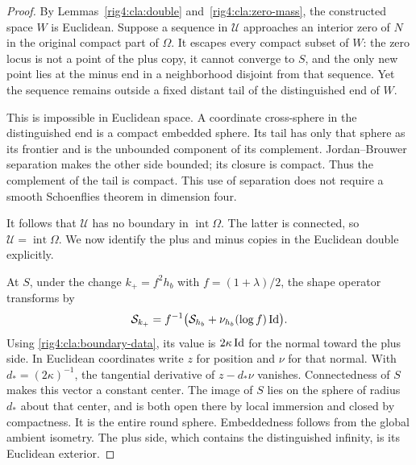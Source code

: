 \begin{proof}
By Lemmas~\ref{rig4:cla:double} and~\ref{rig4:cla:zero-mass}, the constructed
space $W$ is Euclidean.  Suppose a sequence in $\mathcal U$ approaches
an interior zero of $N$ in the original compact part of $\Omega$.
It escapes every compact subset of $W$: the zero locus is not a
point of the plus copy, it cannot converge to $S$, and the only
new point lies at the minus end in a neighborhood disjoint from
that sequence.  Yet the sequence remains outside a fixed distant
tail of the distinguished end of $W$.

This is impossible in Euclidean space.  A coordinate cross-sphere
in the distinguished end is a compact embedded sphere.  Its tail
has only that sphere as its frontier and is the unbounded component
of its complement.  Jordan--Brouwer separation makes the other
side bounded; its closure is compact.  Thus the complement of the
tail is compact.  This use of separation does not require a smooth
Schoenflies theorem in dimension four.

It follows that $\mathcal U$ has no boundary in
$\operatorname{int}\Omega$.  The latter is connected, so
$\mathcal U=\operatorname{int}\Omega$.  We now identify the plus
and minus copies in the Euclidean double explicitly.

At $S$, under the change $k_+=f^2h_b$ with
$f=(1+\lambda)/2$, the shape operator transforms by
\[
 \mathcal S_{k_+}
       =f^{-1}\bigl(\mathcal S_{h_b}
                   +\nu_{h_b}(\log f)\operatorname{Id}\bigr).
\]
Using \eqref{rig4:cla:boundary-data}, its value is $2\kappa\operatorname{Id}$ for
the normal toward the plus side.  In Euclidean coordinates write
$z$ for position and $\nu$ for that normal.  With
$d_*=(2\kappa)^{-1}$, the tangential derivative of $z-d_*\nu$
vanishes.  Connectedness of $S$ makes this vector a constant center.
The image of $S$ lies on the sphere of radius $d_*$ about that
center, and is both open there by local immersion and closed by
compactness.  It is the entire round sphere.  Embeddedness follows
from the global ambient isometry.  The plus side, which contains
the distinguished infinity, is its Euclidean exterior.


\end{proof}

